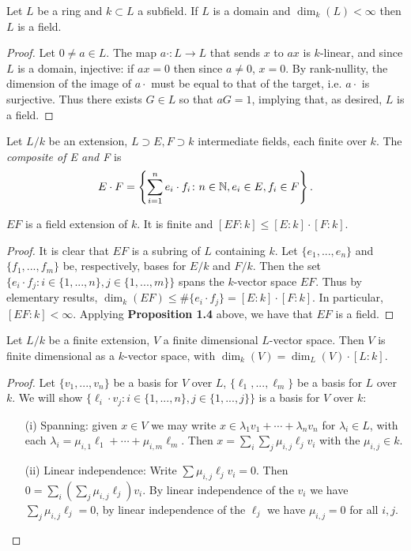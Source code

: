 \begin{prop}\label{prop:domtoField}
Let $L$ be a ring and $k \subset L$ a subfield. If $L$ is a domain and $\dim_k(L) < \infty$ then $L$ is a field.
\end{prop}
\begin{proof}
Let $0 \neq a \in L$. The map $a \cdot \colon L \rightarrow L$ that sends $x$ to $ax$ is $k$-linear, and since $L$ is a domain, injective: if $ax = 0$ then since $a \neq 0$, $x = 0$. By rank-nullity, the dimension of the image of $a \cdot$ must be equal to that of the target, i.e. $a \cdot$ is surjective. Thus there exists $G \in L$ so that $aG = 1$, implying that, as desired, $L$ is a field.
\end{proof}

\begin{defn}
Let $L/k$ be an extension, $L \supset E, F \supset k$ intermediate fields, each finite over $k$. The \textit{composite of E and F} is
\[E \cdot F = \left\{ \sum_{i = 1}^n e_i \cdot f_i \colon n \in \mathbb{N}, e_i \in E, f_i \in F \right\}.\]
\end{defn}

\begin{prop}
$EF$ is a field extension of $k$. It is finite and $[EF : k] \leq [E : k] \cdot [F : k]$.
\end{prop}
\begin{proof}
It is clear that $EF$ is a subring of $L$ containing $k$. Let $\{e_1, ..., e_n\}$ and $\{f_1, ..., f_m\}$ be, respectively, bases for $E/k$ and $F/k$. Then the set $\{e_i \cdot f_j \colon i \in \{1, ..., n\}, j \in \{1, ..., m\}\}$ spans the $k$-vector space $EF$. Thus by elementary results, $\dim_k(EF) \leq \#\{e_i \cdot f_j\} = [E : k] \cdot [F : k]$. In particular, $[EF : k] < \infty$. Applying \textbf{Proposition 1.4} above, we have that $EF$ is a field.
\end{proof}

\begin{prop}
Let $L/k$ be a finite extension, $V$ a finite dimensional $L$-vector space. Then $V$ is finite dimensional as a $k$-vector space, with $\dim_k(V) = \dim_L(V) \cdot [L : k]$.
\end{prop}
\begin{proof}
Let $\{v_1, ..., v_n\}$ be a basis for $V$ over $L$, $\{\ell_1, ..., \ell_m\}$ be a basis for $L$ over $k$. We will show $\{\ell_i \cdot v_j \colon i \in \{1, ..., n\}, j \in \{1, ..., j\}\}$ is a basis for $V$ over $k$:
\begin{enumerate}
\item[(i)] Spanning: given $x \in V$ we may write $x \in \lambda_1v_1 + \cdots + \lambda_nv_n$ for $\lambda_i \in L$, with each $\lambda_i = \mu_{i,1}\ell_1 + \cdots + \mu_{i,m}\ell_m$. Then $x = \sum_i \sum_j \mu_{i, j} \ell_j v_i$ with the $\mu_{i,j} \in k$.
\item[(ii)] Linear independence: Write $\sum \mu_{i,j} \ell_j v_i = 0$. Then $0 = \sum_i \left( \sum_j\mu_{i,j} \ell_j \right) v_i$. By linear independence of the $v_i$ we have $\sum_j\mu_{i,j} \ell_j = 0$, by linear independence of the $\ell_j$ we have $\mu_{i,j} = 0$ for all $i,j$.
\end{enumerate}
\end{proof}


